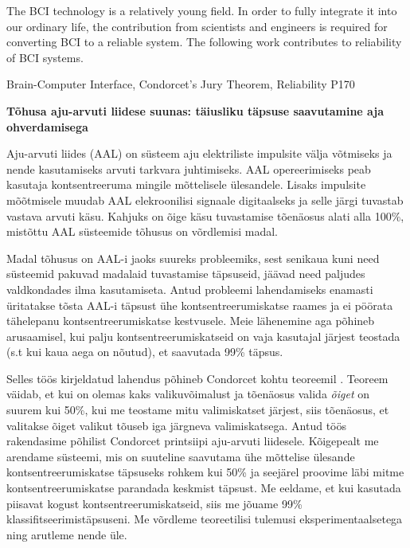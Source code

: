 \documentclass[12pt]{article}
\theoremstyle{definition}
\begin{document}
The BCI technology is a relatively young field. In order to fully integrate it into our ordinary life, the contribution from scientists and engineers is required for converting BCI to a reliable system. The following work contributes to reliability of BCI systems.


\vspace*{3ex}
{}
Brain-Computer Interface, Condorcet's Jury Theorem, Reliability
{}
P170
\vspace*{3ex}

\newpage
{}
\noindent\textbf{\large Tõhusa aju-arvuti liidese suunas: täiusliku täpsuse saavutamine aja ohverdamisega}
\vspace*{2ex}
{ }

Aju-arvuti liides (AAL) on süsteem aju elektriliste impulsite välja võtmiseks ja nende kasutamiseks arvuti tarkvara juhtimiseks. AAL opereerimiseks peab kasutaja kontsentreeruma mingile mõttelisele ülesandele. Lisaks impulsite mõõtmisele muudab AAL elekroonilisi signaale digitaalseks ja selle järgi tuvastab vastava arvuti käsu. Kahjuks on õige käsu tuvastamise tõenäosus alati alla
100\%, mistõttu  AAL süsteemide tõhusus on võrdlemisi madal.

Madal tõhusus on AAL-i jaoks suureks probleemiks, sest senikaua kuni need süsteemid pakuvad madalaid tuvastamise täpsuseid, jäävad need paljudes valdkondades ilma kasutamiseta. Antud probleemi lahendamiseks enamasti üritatakse tõsta AAL-i täpsust ühe kontsentreerumiskatse raames ja ei pöörata tähelepanu kontsentreerumiskatse kestvusele. Meie lähenemine aga põhineb arusaamisel, kui palju kontsentreerumiskatseid on vaja kasutajal järjest teostada (s.t kui kaua aega on nõutud), et saavutada 99\% täpsus.

Selles töös kirjeldatud lahendus põhineb Condorcet kohtu teoreemil \cite{condorcets}. Teoreem väidab, et kui on olemas kaks valikuvõimalust ja tõenäosus valida \textit{õiget} on suurem kui 50\%, kui me teostame mitu valimiskatset järjest, siis tõenäosus, et valitakse õiget valikut tõuseb iga järgneva valimiskatsega. 
Antud töös rakendasime põhilist Condorcet printsiipi aju-arvuti liidesele. Kõigepealt me arendame süsteemi, mis on suuteline saavutama ühe mõttelise ülesande kontsentreerumiskatse täpsuseks rohkem kui 50\% ja seejärel proovime läbi mitme kontsentreerumiskatse parandada keskmist täpsust. Me eeldame, et kui kasutada piisavat kogust kontsentreerumiskatseid, siis me jõuame 99\% klassifitseerimistäpsuseni. Me võrdleme teoreetilisi tulemusi eksperimentaalsetega ning arutleme nende üle.
\end{document}
